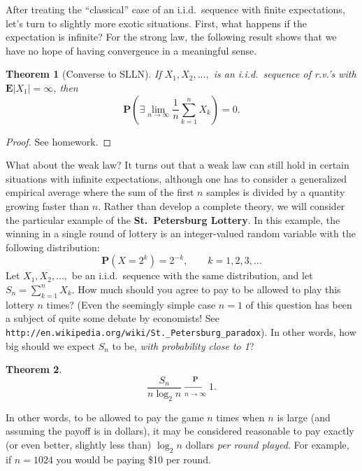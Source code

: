 \documentclass[12pt]{article}
\newtheorem{thm}{Theorem}[section]
\newcommand{\prob}{\mathbf{P}}
\newcommand{\expec}{\mathbf{E}}
\theoremstyle{example}
\begin{document}
After treating the ``classical'' case of an i.i.d.\ sequence with finite expectations, let's turn to slightly more exotic situations. First, what happens if the expectation is infinite? For the strong law, the following result shows that we have no hope of having convergence in a meaningful sense.

\begin{thm}[Converse to SLLN] If $X_1,X_2,\ldots,$ is an i.i.d.\ sequence of r.v.'s with $\expec|X_1|=\infty$, then
$$ \prob\left( \exists \lim_{n\to\infty} \frac{1}{n}\sum_{k=1}^n X_k \right) = 0. $$
\end{thm}

\begin{proof} See homework.
\end{proof}

What about the weak law? It turns out that a weak law can still hold in certain situations with infinite expectations, although one has to consider a generalized empirical average where the sum of the first $n$ samples is divided by a quantity growing faster than $n$. Rather than develop a complete theory, we will consider the particular example of the \textbf{St.\ Petersburg Lottery}. In this example, the winning in a single round of lottery is an integer-valued random variable with the following distribution:
$$ \prob(X=2^k) = 2^{-k}, \qquad k=1,2,3,\ldots $$
Let $X_1,X_2,\ldots,$ be an i.i.d.\ sequence with the same distribution, and let $S_n = \sum_{k=1}^n X_k$. How much should you agree to pay to be allowed to play this lottery $n$ times? (Even the seemingly simple case $n=1$ of this question  has been a subject of quite some debate by economists! See \verb+http://en.wikipedia.org/wiki/St._Petersburg_paradox+). In other words, how big should we expect $S_n$ to be, \emph{with probability close to 1}?

\begin{thm}
$$ \frac{S_n}{n\log_2 n} \xrightarrow[n\to\infty]{\prob} 1. $$
\end{thm}

In other words, to be allowed to pay the game $n$ times when $n$ is large (and assuming the payoff is in dollars), it may be considered reasonable to pay exactly (or even better, slightly less than) $\log_2 n$ dollars \emph{per round played}. For example, if $n=1024$ you would be paying \$10 per round.
\end{document}
